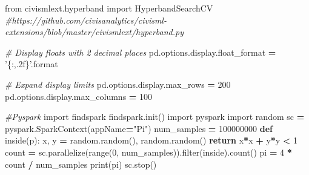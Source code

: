 \documentclass[]{book}
\newenvironment{Shaded}{\begin{snugshade}}{\end{snugshade}}
\newcommand{\KeywordTok}[1]{\textcolor[rgb]{0.13,0.29,0.53}{\textbf{#1}}}
\newcommand{\DecValTok}[1]{\textcolor[rgb]{0.00,0.00,0.81}{#1}}
\newcommand{\StringTok}[1]{\textcolor[rgb]{0.31,0.60,0.02}{#1}}
\newcommand{\ImportTok}[1]{#1}
\newcommand{\CommentTok}[1]{\textcolor[rgb]{0.56,0.35,0.01}{\textit{#1}}}
\newcommand{\ControlFlowTok}[1]{\textcolor[rgb]{0.13,0.29,0.53}{\textbf{#1}}}
\newcommand{\OperatorTok}[1]{\textcolor[rgb]{0.81,0.36,0.00}{\textbf{#1}}}
\newcommand{\BuiltInTok}[1]{#1}
\newcommand{\NormalTok}[1]{#1}
\theoremstyle{definition}
\theoremstyle{definition}
\theoremstyle{definition}
\theoremstyle{remark}
\begin{document}
\begin{Shaded}
\begin{Highlighting}[]
\ImportTok{from}\NormalTok{ civismlext.hyperband }\ImportTok{import}\NormalTok{ HyperbandSearchCV}
\CommentTok{#https://github.com/civisanalytics/civisml-extensions/blob/master/civismlext/hyperband.py}
\end{Highlighting}
\end{Shaded}

\begin{Shaded}
\begin{Highlighting}[]
\CommentTok{# Display floats with 2 decimal places}
\NormalTok{pd.options.display.float_format }\OperatorTok{=} \StringTok{'\{:,.2f\}'}\NormalTok{.}\BuiltInTok{format}
 
\CommentTok{# Expand display limits}
\NormalTok{pd.options.display.max_rows }\OperatorTok{=} \DecValTok{200}
\NormalTok{pd.options.display.max_columns }\OperatorTok{=} \DecValTok{100}
\end{Highlighting}
\end{Shaded}

\begin{Shaded}
\begin{Highlighting}[]
\CommentTok{#Pyspark}
\ImportTok{import}\NormalTok{ findspark}
\NormalTok{findspark.init()}
\ImportTok{import}\NormalTok{ pyspark}
\ImportTok{import}\NormalTok{ random}
\NormalTok{sc }\OperatorTok{=}\NormalTok{ pyspark.SparkContext(appName}\OperatorTok{=}\StringTok{"Pi"}\NormalTok{)}
\NormalTok{num_samples }\OperatorTok{=} \DecValTok{100000000}
\KeywordTok{def}\NormalTok{ inside(p):     }
\NormalTok{    x, y }\OperatorTok{=}\NormalTok{ random.random(), random.random()}
    \ControlFlowTok{return}\NormalTok{ x}\OperatorTok{*}\NormalTok{x }\OperatorTok{+}\NormalTok{ y}\OperatorTok{*}\NormalTok{y }\OperatorTok{<} \DecValTok{1}
\NormalTok{count }\OperatorTok{=}\NormalTok{ sc.parallelize(}\BuiltInTok{range}\NormalTok{(}\DecValTok{0}\NormalTok{, num_samples)).}\BuiltInTok{filter}\NormalTok{(inside).count()}
\NormalTok{pi }\OperatorTok{=} \DecValTok{4} \OperatorTok{*}\NormalTok{ count }\OperatorTok{/}\NormalTok{ num_samples}
\BuiltInTok{print}\NormalTok{(pi)}
\NormalTok{sc.stop()}
\end{Highlighting}
\end{Shaded}
\end{document}
